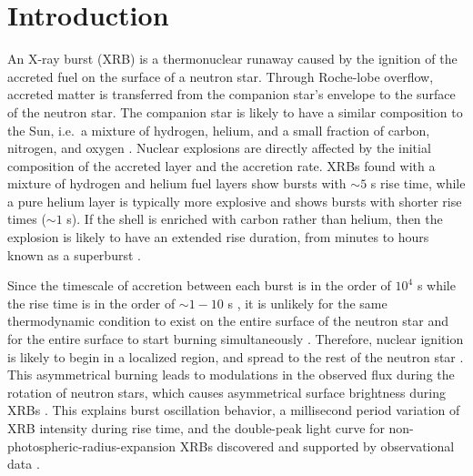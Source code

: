 \documentclass[preprint,times,tighten,linenumbers,trackchanges]{aastex631}
\newcommand{\MarginPar}[1]{
    \marginpar{\vskip-\baselineskip%
               \raggedright%
               \tiny\sffamily%
               {\color{red}\hrule%
               \smallskip%
               #1\par%
               \smallskip%
               \hrule}}%
}
\begin{document}

\section{Introduction}\label{Sec:Introduction}
An X-ray burst (XRB) is a thermonuclear runaway caused by the ignition of the accreted fuel on the surface of a neutron star. Through Roche-lobe overflow, accreted matter is transferred from the companion star's envelope to the surface of the neutron star. The companion star is likely to have a similar composition to the Sun, i.e.\ a mixture of hydrogen, helium, and a small fraction of carbon, nitrogen, and oxygen \citep{Galloway_2020_basics_of_xrb}. Nuclear explosions are directly affected by the initial composition of the accreted layer and the accretion rate. XRBs found with a mixture of hydrogen and helium fuel layers show bursts with $\sim 5$ s rise time, while a pure helium layer is typically more explosive and shows bursts with shorter rise times ($\sim 1$ s). If the shell is enriched with carbon rather than helium, then the explosion is likely to have an extended rise duration, from minutes to hours known as a superburst \citep{Kuulkers_2002,Cumming_2001,Gupta_2007}. 

Since the timescale of accretion between each burst is in the order of $10^4$ s while the rise time is in the order of $\sim 1 - 10$ s \citep{Parikh_2013}, it is unlikely for the same thermodynamic condition to exist on the entire surface of the neutron star and for the entire surface to start burning simultaneously \citep{Shara_1982}. Therefore, nuclear ignition is likely to begin in a localized region, and spread to the rest of the neutron star \citep{Spitkovsky_2002}. This asymmetrical burning leads to modulations in the observed flux during the rotation of neutron stars, which causes asymmetrical surface brightness during XRBs \citep{strohmayer_2009}. This explains burst oscillation behavior, a millisecond period variation of XRB intensity during rise time, and the double-peak light curve for non-photospheric-radius-expansion XRBs discovered and supported by observational data \citep{Altamirano_2010,Chakraborty_2014,Bhattacharyya_2006, Kaaret_2007,Smith_1997}.  
\end{document}
